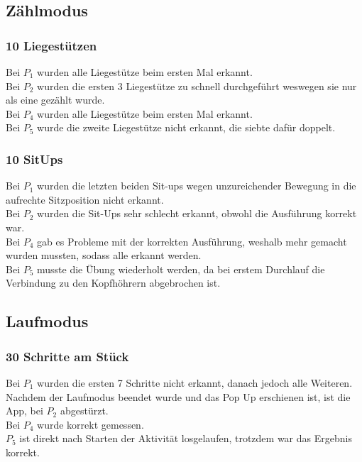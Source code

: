 \documentclass[a4paper,12pt]{article}
\begin{document}
\subsection{Zählmodus}
\subsubsection{10 Liegestützen}
Bei $P_1$ wurden alle Liegestütze beim ersten Mal erkannt.\\
Bei $P_2$ wurden die ersten 3 Liegestütze zu schnell durchgeführt weswegen sie nur als eine gezählt wurde.\\
Bei $P_4$ wurden alle Liegestütze beim ersten Mal erkannt.\\
Bei $P_5$ wurde die zweite Liegestütze nicht erkannt, die siebte dafür doppelt.\\
\subsubsection{10 SitUps}
Bei $P_1$ wurden die letzten beiden Sit-ups wegen unzureichender Bewegung in die aufrechte Sitzposition nicht erkannt.\\
Bei $P_2$ wurden die Sit-Ups sehr schlecht erkannt, obwohl die Ausführung korrekt war.\\
Bei $P_4$ gab es Probleme mit der korrekten Ausführung, weshalb mehr gemacht wurden mussten, sodass alle erkannt werden.\\
Bei $P_5$ musste die Übung wiederholt werden, da bei erstem Durchlauf die Verbindung zu den Kopfhöhrern abgebrochen ist.
\subsection{Laufmodus}
\subsubsection{30 Schritte am Stück}
Bei $P_1$ wurden die ersten 7 Schritte nicht erkannt, danach jedoch alle Weiteren.\\
Nachdem der Laufmodus beendet wurde und das Pop Up erschienen ist, ist die App, bei $P_2$  abgestürzt.\\
Bei $P_4$ wurde korrekt gemessen.\\
$P_5$ ist direkt nach Starten der Aktivität losgelaufen, trotzdem war das Ergebnis korrekt.
\end{document}
